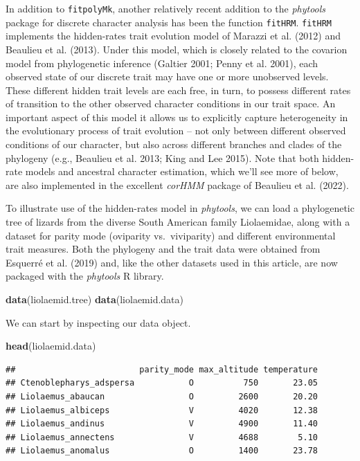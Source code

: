 \documentclass[fleqn,10pt,lineno]{wlpeerj} %
\newenvironment{Shaded}{\begin{snugshade}}{\end{snugshade}}
\newcommand{\FunctionTok}[1]{\textcolor[rgb]{0.13,0.29,0.53}{\textbf{#1}}}
\newcommand{\NormalTok}[1]{#1}
\begin{document}
In addition to \texttt{fitpolyMk}, another relatively recent addition to the \emph{phytools} package for discrete character analysis has been the function \texttt{fitHRM}. \texttt{fitHRM} implements the hidden-rates trait evolution model of Marazzi et al. (2012) and Beaulieu et al. (2013). Under this model, which is closely related to the covarion model from phylogenetic inference (Galtier 2001; Penny et al. 2001), each observed state of our discrete trait may have one or more unobserved levels. These different hidden trait levels are each free, in turn, to possess different rates of transition to the other observed character conditions in our trait space. An important aspect of this model it allows us to explicitly capture heterogeneity in the evolutionary process of trait evolution -- not only between different observed conditions of our character, but also across different branches and clades of the phylogeny (e.g., Beaulieu et al. 2013; King and Lee 2015). Note that both hidden-rate models and ancestral character estimation, which we'll see more of below, are also implemented in the excellent \emph{corHMM} package of Beaulieu et al. (2022).

To illustrate use of the hidden-rates model in \emph{phytools}, we can load a phylogenetic tree of lizards from the diverse South American family Liolaemidae, along with a dataset for parity mode (oviparity vs.~viviparity) and different environmental trait measures. Both the phylogeny and the trait data were obtained from Esquerré et al. (2019) and, like the other datasets used in this article, are now packaged with the \emph{phytools} R library.

\begin{Shaded}
\begin{Highlighting}[]
\FunctionTok{data}\NormalTok{(liolaemid.tree)}
\FunctionTok{data}\NormalTok{(liolaemid.data)}
\end{Highlighting}
\end{Shaded}

We can start by inspecting our data object.

\begin{Shaded}
\begin{Highlighting}[]
\FunctionTok{head}\NormalTok{(liolaemid.data)}
\end{Highlighting}
\end{Shaded}

\begin{verbatim}
##                         parity_mode max_altitude temperature
## Ctenoblepharys_adspersa           O          750       23.05
## Liolaemus_abaucan                 O         2600       20.20
## Liolaemus_albiceps                V         4020       12.38
## Liolaemus_andinus                 V         4900       11.40
## Liolaemus_annectens               V         4688        5.10
## Liolaemus_anomalus                O         1400       23.78
\end{verbatim}
\end{document}
